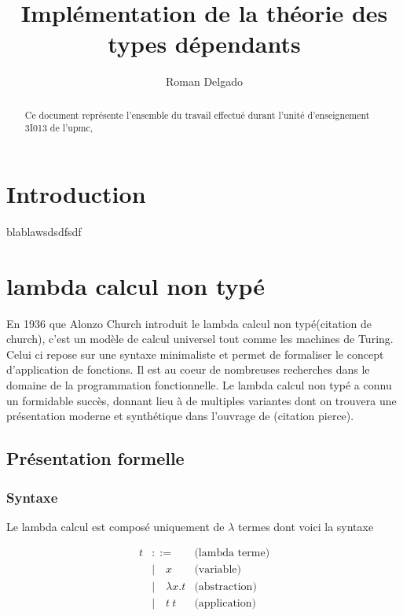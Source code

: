 \documentclass {article}
\title{Implémentation de la théorie des types dépendants}
\author{Roman Delgado}
\date{}
\theoremstyle{definition}
\theoremstyle{remark}
\begin{document}
\maketitle




\begin{abstract} 
  Ce document représente l'ensemble du travail effectué durant l'unité d'enseignement 3I013 de l'upmc,
\end{abstract}

\tableofcontents

\clearpage


\section{Introduction}

blablawsdsdfsdf

\section{lambda calcul non typé}

En 1936 que Alonzo Church introduit le lambda calcul non typé(citation de church), c'est
un modèle de calcul universel tout comme les machines de Turing. Celui ci repose
sur une syntaxe minimaliste et permet de formaliser le concept d'application 
de fonctions. Il est au coeur de nombreuses recherches dans le domaine de la programmation fonctionnelle. Le lambda calcul non typé a connu un formidable 
succès, donnant lieu à de multiples variantes dont on trouvera une présentation
 moderne et synthétique dans l'ouvrage de (citation pierce).

\subsection{Présentation formelle}

\subsubsection{Syntaxe}
Le lambda calcul est composé uniquement de \(\lambda\) termes dont voici la syntaxe

\begin{align*}
  t &::= & \mbox{(lambda terme)} \\
  &|\quad x & \mbox{(variable)} \\
  &|\quad \lambda x. t & \mbox{(abstraction)} \\
  &|\quad t\: t          & \mbox{(application)}
\end{align*}
\end{document}
